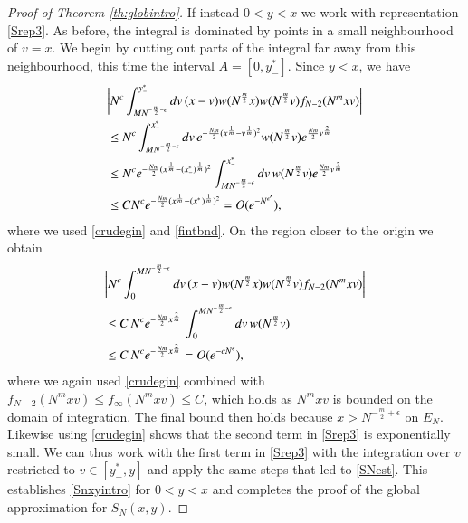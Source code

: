 \documentclass[11pt,reqno]{amsproc}
\numberwithin{equation}{section}
\numberwithin{theorem}{section}
\begin{document}
\begin{proof}[Proof of Theorem \ref{th:globintro}]
If instead $0 < y < x$ we work with representation \eqref{Srep3}. As before, the integral is dominated by points in a small neighbourhood of $v=x$. We begin by cutting out parts of the integral far away from this neighbourhood, this time the interval $A = [0,y^{*}_{-}]$. Since $y < x$, we have 
\begin{align}
&\bigg{|}N^{c}\int_{MN^{-\frac{m}{2}-\epsilon}}^{y^{*}_{-}}dv\,(x-v)w(N^{\frac{m}{2}}x)w(N^{\frac{m}{2}}v)f_{N-2}(N^{m}xv)\bigg{|}\\
&\leq N^{c}\int_{MN^{-\frac{m}{2}-\epsilon}}^{x^{*}_{-}}dv\,e^{-\frac{Nm}{2}(x^{\frac{1}{m}}-v^{\frac{1}{m}})^{2}}w(N^{\frac{m}{2}}v)e^{\frac{Nm}{2}v^{\frac{2}{m}}}\\
&\leq N^{c}e^{-\frac{Nm}{2}(x^{\frac{1}{m}}-(x^{*}_{-})^{\frac{1}{m}})^{2}}\int_{MN^{-\frac{m}{2}-\epsilon}}^{x^{*}_{-}}dv\,w(N^{\frac{m}{2}}v)e^{\frac{Nm}{2}v^{\frac{2}{m}}}\\
&\leq CN^{c}e^{-\frac{Nm}{2}(x^{\frac{1}{m}}-(x^{*}_{-})^{\frac{1}{m}})^{2}} = O(e^{-N^{\epsilon'}}),
\end{align}
where we used \eqref{crudegin} and \eqref{fintbnd}. On the region closer to the origin we obtain
\begin{align}
&\bigg{|}N^{c}\int_{0}^{MN^{-\frac{m}{2}-\epsilon}}dv\,(x-v)w(N^{\frac{m}{2}}x)w(N^{\frac{m}{2}}v)f_{N-2}(N^{m}xv)\bigg{|}\\
&\leq C\,N^{c}e^{-\frac{Nm}{2}x^{\frac{2}{m}}}\,\int_{0}^{MN^{-\frac{m}{2}-\epsilon}}dv\,w(N^{\frac{m}{2}}v)\\
&\leq C\,N^{c}e^{-\frac{Nm}{2}x^{\frac{2}{m}}} = O(e^{-cN^{\epsilon}}),
\end{align}
where we again used \eqref{crudegin} combined with $f_{N-2}(N^{m}xv) \leq f_{\infty}(N^{m}xv) \leq C$, which holds as $N^{m}xv$ is bounded on the domain of integration. The final bound then holds because $x > N^{-\frac{m}{2}+\epsilon}$ on $E_{N}$. Likewise using \eqref{crudegin} shows that the second term in \eqref{Srep3} is exponentially small. We can thus work with the first term in \eqref{Srep3} with the integration over $v$ restricted to $v \in [y_{-}^{*},y]$ and apply the same steps that led to \eqref{SNest}. This establishes \eqref{Snxyintro} for $0 < y < x$ and completes the proof of the global approximation for $S_{N}(x,y)$.


\end{proof}
\end{document}

